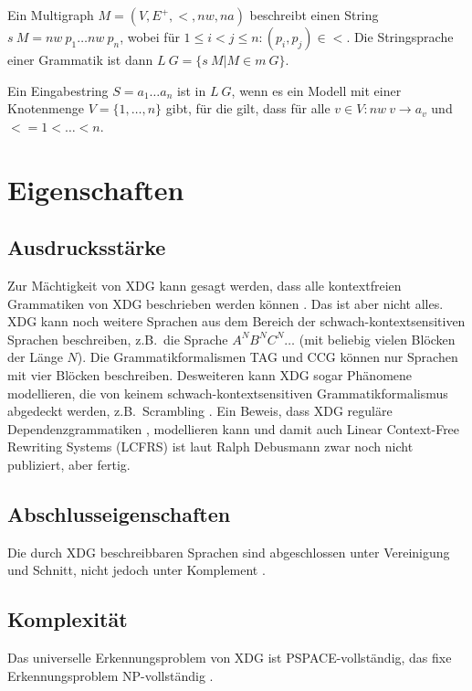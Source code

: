Ein Multigraph $M=(V, E^+, <, \mathit{nw}, \mathit{na})$ beschreibt
einen String $s\ M = \mathit{nw}~p_1 \ldots \mathit{nw}~ p_n$, wobei
f\"ur $1 \leq i < j \leq n: (p_i, p_j) \in <$. Die Stringsprache einer
Grammatik ist dann $L\ G=\{s\ M|M \in m\ G\}$.

Ein Eingabestring $S=a_1 \ldots a_n$ ist in $L\ G$, wenn es ein Modell
mit einer Knotenmenge $V=\{1, \ldots , n\}$ gibt, f\"ur die gilt, dass
f\"ur alle $v \in V: \mathit{nw}~v \rightarrow a_v$ und $< = 1 <
\ldots < n$.

\section{Eigenschaften}

\subsection{Ausdrucksst\"arke}

Zur M\"achtigkeit von XDG kann gesagt werden, dass alle kontextfreien
Grammatiken von XDG beschrieben werden k\"onnen \cite{Debusmann06}.
Das ist aber nicht alles. XDG kann noch weitere Sprachen aus dem
Bereich der schwach-kontextsensitiven Sprachen beschreiben, z.B.\ die
Sprache $A^N B^N C^N \ldots $ (mit beliebig vielen Bl\"ocken der
L\"ange $N$).  Die Grammatikformalismen TAG und CCG k\"onnen nur
Sprachen mit vier Bl\"ocken beschreiben. Desweiteren kann XDG sogar
Ph\"anomene modellieren, die von keinem schwach-kontextsensitiven
Grammatikformalismus abgedeckt werden, z.B.\ Scrambling
\cite{Debusmann07MTS}. Ein Beweis, dass XDG regul\"are
Dependenzgrammatiken \cite{KuhlmannMoehl07}, \cite{Kuhlmann07}
modellieren kann und damit auch Linear Context-Free Rewriting Systems
(LCFRS) ist laut Ralph Debusmann zwar noch nicht publiziert, aber
fertig.

\subsection{Abschlusseigenschaften}

Die durch XDG beschreibbaren Sprachen sind abgeschlossen unter
Vereinigung und Schnitt, nicht jedoch unter Komplement
\cite{Debusmann07MTS}.

\subsection{Komplexit\"at}      

Das universelle Erkennungsproblem von XDG ist PSPACE-vollst\"andig,
das fixe Erkennungsproblem NP-vollst\"andig \cite{Debusmann07FG}.
